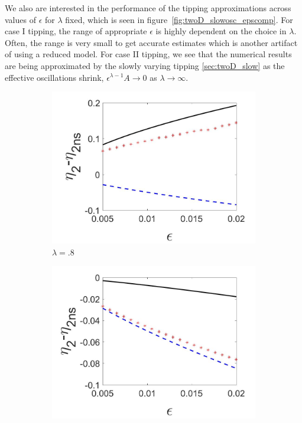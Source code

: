 \indent We also are interested in the performance of the tipping approximations across values of $\epsilon$ for $\lambda$ fixed, which is seen in figure~\ref{fig:twoD_slowosc_epscomp}. For case I tipping, the range of appropriate $\epsilon$ is highly dependent on the choice in $\lambda$. Often, the range is very small to get accurate estimates which is another artifact of using a reduced model. For case II tipping, we see that the numerical results are being approximated by the slowly varying tipping \autoref{sec:twoD_slow} as the effective oscillations shrink, $\epsilon^{\lambda-1}A\to 0$ as $\lambda\to\infty$.


\begin{figure}[H]
\centering
\begin{subfigure}{.5\textwidth}
 \centering
 \includegraphics[width=\linewidth]{twoD/slowosc_epscomp_mixed.jpg}
 \caption{$\lambda=.8$}
\end{subfigure}%
\begin{subfigure}{.5\textwidth}
 \centering
 \includegraphics[width=\linewidth]{twoD/slowosc_epscomp_slow.jpg}

\end{subfigure}
\end{figure}
